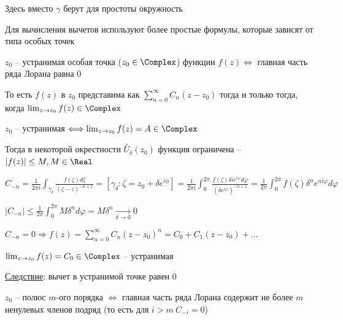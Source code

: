 \documentclass[12pt]{article}
\begin{document}
Здесь вместо $\gamma$ берут для простоты окружность

\Nota Для вычисления вычетов используют более простые формулы, которые зависят от типа особых точек

\begin{MyTheorem}
     $z_0$ -- устранимая особая точка ($z_0 \in \Complex$) функции $f(z) \Longleftrightarrow$ главная часть ряда Лорана равна 0
    
    То есть $f(z)$ в $z_0$ представима как $\sum_{n = 0}^\infty C_n (z - z_0)$ тогда и только тогда, когда $\lim_{z \to z_0} f(z) \in \Complex$
\end{MyTheorem}

\begin{MyProof}
    \fbox{$\Longrightarrow$} $z_0$ -- устранимая $\Longleftrightarrow \lim_{z \to z_0} f(z) = A \in \Complex$

    Тогда в некоторой окрестности $\overset{\circ}{U}_\delta (z_0)$ функция ограничена -- $|f(z)| \leq M, M \in \Real$

    $C_{-n} = \frac{1}{2\pi i} \int_{\gamma_\delta} \frac{f(\zeta)d\zeta}{(\zeta - z)^{-n + 1}} = \left[\gamma_\delta: \zeta = z_0 + \delta e^{i\phi}\right] = \frac{1}{2\pi i} \int_{0}^{2\pi} \frac{f(\zeta) \delta i e^{i\varphi} d\varphi}{(\delta e^{i\varphi})^{-n + 1}} = \frac{1}{2\pi} \int_0^{2\pi} f(\zeta) \delta^{n} e^{ni\varphi} d\varphi$

    $|C_{-n}| \leq \frac{1}{2\pi} \int_0^{2\pi} M \delta^n d\varphi = M \delta^n \underset{\delta \to 0}{\longrightarrow} 0$

    \mediumvspace

    \fbox{$\Longleftarrow$} $C_{-n} = 0 \Longrightarrow f(z) = \sum_{n = 0}^\infty C_n (z - z_0)^n = C_0 + C_1 (z - z_0) + \dots$

    $\lim_{z \to z_0} f(z) = C_0 \in \Complex$ -- устранимая
\end{MyProof}

\underline{Следствие}: вычет в устранимой точке равен 0

\begin{MyTheorem}
     $z_0$ -- полюс $m$-ого порядка $\Longleftrightarrow$ главная часть ряда Лорана содержит не более $m$ ненулевых членов подряд (то есть для $i > m \ C_{-i} = 0$) 
\end{MyTheorem}
\end{document}
